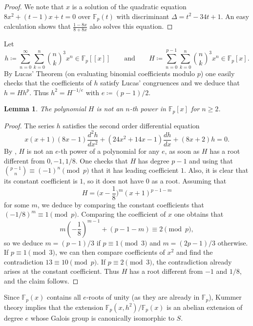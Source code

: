 \documentclass{article}
\newcommand{\F}{\mathbb{F}}
\newcommand{\Fp}{\mathbb{F}_p}
\newcommand{\ps}[1]{[\![#1]\!]}
\theoremstyle{definition}
\theoremstyle{plain}
\newtheorem{lem}[defi]{Lemma}
\theoremstyle{remark}
\begin{document}
\begin{proof}
     We note that $x$ is a solution of the quadratic equation $8x^2+(t-1)x+t=0$ over $\F_p(t)$ with discriminant $\Delta=t^2-34t+1$. An easy calculation shows that $\frac{1-8x}{8+8x}$ also solves this equation.
\end{proof}

Let \[h\coloneqq \sum_{n=0}^\infty \sum_{k=0}^{n}\binom{n}{k}^3x^n \in \Fp\ps{x} \qquad \text{and} \qquad H\coloneqq \sum_{n=0}^{p-1} \sum_{k=0}^{n}\binom{n}{k}^3 x^n \in \Fp[x].\] 
By Lucas' Theorem (on evaluating binomial coefficients modulo $p$) one easily checks that the coefficients of $h$ satisfy Lucas' congruences and we deduce that 
$h=H h^p$. Thus $h^2 = H^{-1/e}$ with $e \coloneq (p{-}1)/2$.

\begin{lem}
 The polynomial $H$ is not an $n$-th power in $\F_p[x]$ for $n\geq 2$.
\end{lem}
\begin{proof}
The series $h$ satisfies the second order differential equation 
\begin{equation} \label{eq:deq:h} \textstyle
    x(x+1)(8x-1)\frac{d^2h}{dx^2} + (24x^2+14x-1) \frac{dh}{dx} + (8x+2)h = 0. 
\end{equation}
By \cite[Lemma~2.1.3]{CFV25}, $H$ is not an $e$-th power of a polynomial for any $e$, as soon as $H$ has a root different from $0, -1, 1/8$. One checks that $H$ has degree $p{-}1$ and using that $\binom{p{-}1}{n}\equiv (-1)^n \pmod p$ that it has leading coefficient $1$. Also, it is clear that its constant coefficient is $1$, so it does not have $0$ as a root. Assuming that 
\[\textstyle H=\big(x-\frac 1 8\big)^m (x+1)^{p-1-m}\] for some $m$, we deduce by comparing the constant coefficients that $(-1/8)^m\equiv 1 \pmod p$. Comparing the coefficient of $x$ one obtains that
\[m\left(-\frac 1 8 \right) ^{m-1}+ (p-1-m) \equiv 2 \pmod p,\]
so we deduce $m=(p{-}1)/3$ if $p\equiv 1 \pmod 3$ and $m=(2p{-}1)/3$ otherwise.
If $p\equiv 1 \pmod 3$, we can then compare coefficients of $x^2$ and find the contradiction $13\equiv10\pmod p$.
If $p\equiv 2 \pmod 3$, the contradiction already arises at the constant coefficient.
Thus $H$ has a root different from $-1$ and $1/8$, and the claim follows.
\end{proof}

Since $\F_p(x)$ contains all $e$-roots of unity (as they are already in $\F_p$), Kummer theory implies that the extension $\F_p(x, h^2)/\F_p(x)$ is an abelian extension of degree $e$ whose Galois group is canonically isomorphic to $S$.
\end{document}
